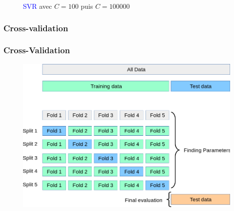 \documentclass{beamer}
\begin{document}
\begin{frame}
\begin{figure}[h]
\begin{minipage}{0.5\textwidth}
		\end{minipage}
		\caption{\textcolor{blue}{SVR} avec $C=100$ puis $C=100000$}
	\end{figure}
\end{frame}

\subsubsection{Cross-validation}
\begin{frame}
	\frametitle{Cross-Validation}
	\begin{figure}[b]
		\centering
		\includegraphics[scale=0.3]{gscv}
	\end{figure}
\end{frame}
\end{document}
